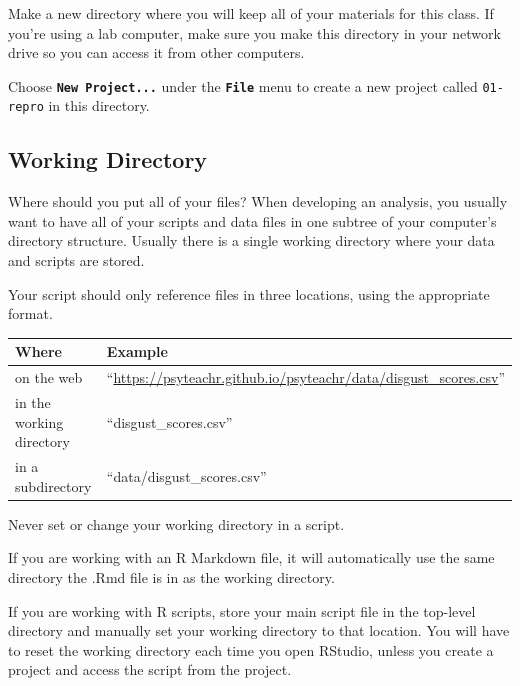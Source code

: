 \documentclass[
  oneside]{book}
\begin{document}
\begin{try}
Make a new directory where you will keep all of your materials for this class. If you're using a lab computer, make sure you make this directory in your network drive so you can access it from other computers.

Choose \textbf{\texttt{New\ Project...}} under the \textbf{\texttt{File}} menu to create a new project called \texttt{01-repro} in this directory.

\end{try}

\hypertarget{working-directory}{%
\subsection{Working Directory}\label{working-directory}}

Where should you put all of your files? When developing an analysis, you usually want to have all of your scripts and data files in one subtree of your computer's directory structure. Usually there is a single working directory where your data and scripts are stored.

Your script should only reference files in three locations, using the appropriate format.

\begin{longtable}[]{@{}
  >{\raggedright\arraybackslash}p{}
  >{\raggedright\arraybackslash}p{}@{}}
\toprule
Where & Example \\
\midrule
\endhead
on the web & ``\url{https://psyteachr.github.io/psyteachr/data/disgust_scores.csv}'' \\
in the working directory & ``disgust\_scores.csv'' \\
in a subdirectory & ``data/disgust\_scores.csv'' \\
\bottomrule
\end{longtable}

\begin{warning}
Never set or change your working directory in a script.

\end{warning}

If you are working with an R Markdown file, it will automatically use the same directory the .Rmd file is in as the working directory.

If you are working with R scripts, store your main script file in the top-level directory and manually set your working directory to that location. You will have to reset the working directory each time you open RStudio, unless you create a project and access the script from the project.
\end{document}
